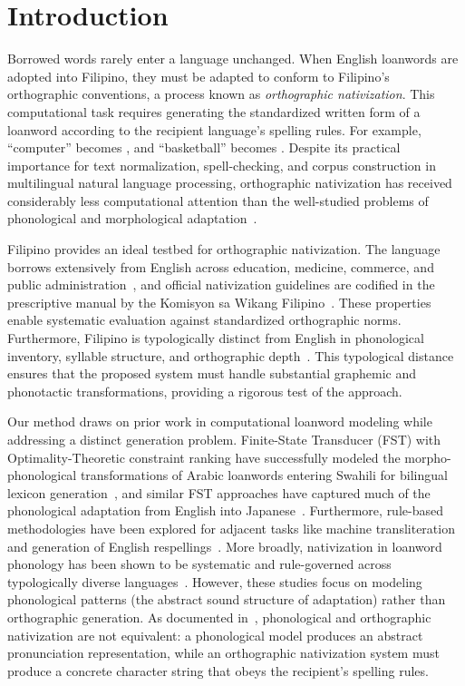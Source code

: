 \section{Introduction}

Borrowed words rarely enter a language unchanged. When English loanwords are
adopted into Filipino, they must be adapted to conform to Filipino's
orthographic conventions, a process known as \emph{orthographic nativization}.
This computational task requires generating the standardized written form of a
loanword according to the recipient language's spelling rules. For example,
``computer'' becomes , and ``basketball'' becomes
. Despite its practical importance for text normalization,
spell-checking, and corpus construction in multilingual natural language
processing, orthographic nativization has received considerably less
computational attention than the well-studied problems of phonological and
morphological adaptation~\cite{kang2011,uffmann2015,wang2025,daland2015}.

Filipino provides an ideal testbed for orthographic nativization. The language
borrows extensively from English across education, medicine, commerce, and
public administration~\cite{martin2020,baklanova2017}, and official
nativization guidelines are codified in the prescriptive manual by the Komisyon
sa Wikang Filipino~\cite{almario2014}. These properties enable systematic
evaluation against standardized orthographic norms. Furthermore, Filipino is
typologically distinct from English in phonological inventory, syllable
structure, and orthographic depth~\cite{llamzon1966,schachter1972,llamzon1997}.
This typological distance ensures that the proposed system must handle
substantial graphemic and phonotactic transformations, providing a rigorous
test of the approach.

Our method draws on prior work in computational loanword modeling while
addressing a distinct generation problem. Finite-State Transducer (FST) with
Optimality-Theoretic constraint ranking have successfully modeled the
morpho-phonological transformations of Arabic loanwords entering Swahili for
bilingual lexicon generation~\cite{tsvetkov2015}, and similar FST approaches
have captured much of the phonological adaptation from English into
Japanese~\cite{mao2016}. Furthermore, rule-based methodologies have been
explored for adjacent tasks like machine transliteration and generation of
English respellings~\cite{syauqi2025,hauer2013}. More broadly, nativization in
loanword phonology has been shown to be systematic and rule-governed across
typologically diverse languages~\cite{kang2011}. However, these studies focus
on modeling phonological patterns (the abstract sound structure of adaptation)
rather than orthographic generation. As documented
in~\cite{wang2025,daland2015}, phonological and orthographic nativization are
not equivalent: a phonological model produces an abstract pronunciation
representation, while an orthographic nativization system must produce a
concrete character string that obeys the recipient's spelling rules.

